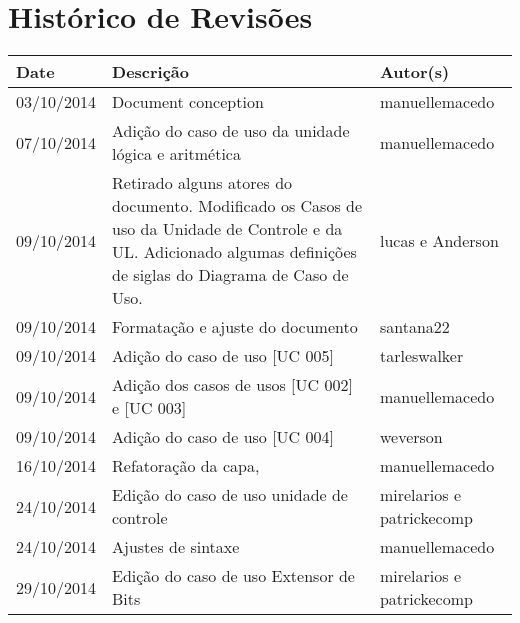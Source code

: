\documentclass{article}
\begin{document}

\capa
\newpage

\section*{\center Histórico de Revisões}
  \vspace*{1cm}
  \begin{table}[ht]
    \centering
    \begin{tabular}[pos]{|m{2cm} | m{7.2cm} | m{3.8cm}|} 
      \hline
      \cellcolor[gray]{0.9}
      \textbf{Date} & \cellcolor[gray]{0.9}\textbf{Descrição} & \cellcolor[gray]{0.9}\textbf{Autor(s)}\\ \hline
      
      \small 03/10/2014 & \small Document conception & \small manuellemacedo \\ \hline      
	
      \small 07/10/2014 & \small Adição do caso de uso da unidade lógica e aritmética & \small manuellemacedo \\ \hline
      \small 09/10/2014 & \small Retirado alguns atores do documento. Modificado os Casos de uso da Unidade de Controle e da UL. Adicionado algumas definições de siglas do Diagrama de Caso de Uso. & \small lucas e Anderson \\ \hline 
      \small 09/10/2014 & \small Formatação e ajuste do documento & \small santana22 \\ \hline
      \small 09/10/2014 & \small Adição do caso de uso [UC 005] & \small tarleswalker \\ \hline
      \small 09/10/2014 & \small Adição dos casos de usos [UC 002] e [UC 003] & \small manuellemacedo \\ \hline
       \small 09/10/2014 & \small Adição do caso de uso [UC 004] & \small weverson \\ \hline
       \small 16/10/2014 & \small Refatoração da capa,  & \small manuellemacedo \\ \hline
       \small 24/10/2014 & \small Edição do caso de uso unidade de controle  & \small mirelarios e patrickecomp \\ \hline
       \small 24/10/2014 & \small Ajustes de sintaxe  & \small manuellemacedo \\ \hline
       \small 29/10/2014 & \small Edição do caso de uso Extensor de Bits  & \small mirelarios e patrickecomp \\ \hline
    \end{tabular}
  \end{table}
\end{document}
